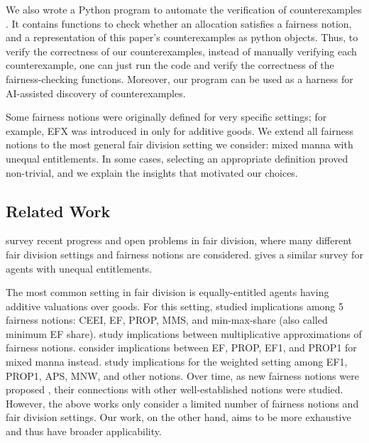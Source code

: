We also wrote a Python program to automate the verification of counterexamples \citep{fd-cex-checker}.
It contains functions to check whether an allocation satisfies a fairness notion,
and a representation of this paper's counterexamples as python objects.
Thus, to verify the correctness of our counterexamples,
instead of manually verifying each counterexample,
one can just run the code and verify the correctness of the fairness-checking functions.
Moreover, our program can be used as a harness for AI-assisted discovery of counterexamples.

Some fairness notions were originally defined for very specific settings;
for example, EFX was introduced in \citet{caragiannis2019unreasonable} only for additive goods.
We extend all fairness notions to the most general fair division setting we consider:
mixed manna with unequal entitlements.
In some cases, selecting an appropriate definition proved non-trivial,
and we explain the insights that motivated our choices.

\subsection{Related Work}
\label{sec:intro:related-work}

\citet{amanatidis2023fair} survey recent progress and open problems in fair division,
where many different fair division settings and fairness notions are considered.
\citet{suksompong2025weighted} gives a similar survey for agents with unequal entitlements.

The most common setting in fair division is equally-entitled agents
having additive valuations over goods. For this setting, \citet{bouveret2016characterizing}
studied implications among 5 fairness notions: CEEI, EF, PROP, MMS, and min-max-share
(also called minimum EF share).
\citet{amanatidis2018comparing} study implications between
multiplicative approximations of fairness notions.
\citet{aziz2021fair} consider implications between EF, PROP, EF1, and PROP1 for mixed manna instead.
\citet{chakraborty2024weighted} study implications for the weighted setting
among EF1, PROP1, APS, MNW, and other notions.
Over time, as new fairness notions were proposed
\citep{caragiannis2023new,babaioff2023fair,barman2018groupwise,aziz2018knowledge},
their connections with other well-established notions were studied.
However, the above works only consider a limited number of fairness notions and fair division settings.
Our work, on the other hand, aims to be more exhaustive and thus have broader applicability.


